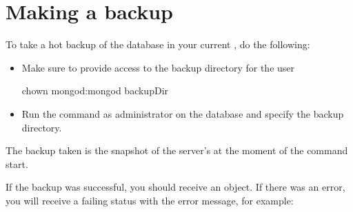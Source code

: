 \documentclass[letterpaper,10pt,english]{sphinxmanual}
\begin{document}
\section{Making a backup}
\label{\detokenize{hot-backup:making-a-backup}}
\sphinxAtStartPar
To take a hot backup of the database in your current , do the following:
\begin{itemize}
\item {} 
\sphinxAtStartPar
Make sure to provide access to the backup directory for the  user

\begin{sphinxVerbatim}[commandchars=\\\{\}]
chown mongod:mongod \PYGZlt{}backupDir\PYGZgt{}
\end{sphinxVerbatim}

\item {} 
\sphinxAtStartPar
Run the  command as administrator on the  database and specify the backup directory.

\begin{sphinxVerbatim}[commandchars=\\\{\}]
\end{sphinxVerbatim}

\end{itemize}

\sphinxAtStartPar
The backup taken is the snapshot of the  server’s  at the moment of the  command start.

\sphinxAtStartPar
If the backup was successful, you should receive an  object.
If there was an error, you will receive a failing  status
with the error message, for example:
\end{document}
